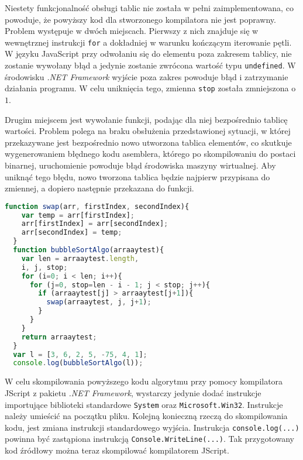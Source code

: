 \par Niestety funkcjonalność obsługi tablic nie została w pełni zaimplementowana, co powoduje, że powyższy kod dla stworzonego kompilatora nie jest poprawny. Problem występuje w dwóch miejscach. Pierwszy z nich znajduje się w wewnętrznej instrukcji \texttt{for} a dokładniej w warunku kończącym iterowanie pętli. W języku JavaScript przy odwołaniu się do elementu poza zakresem tablicy, nie zostanie wywołany błąd a jedynie zostanie zwrócona wartość typu \texttt{undefined}. W środowisku \textit{.NET Framework} wyjście poza zakres powoduje błąd i zatrzymanie działania programu. W celu uniknięcia tego, zmienna \texttt{stop} została zmniejszona o $1$. 
\par Drugim miejscem jest wywołanie funkcji, podając dla niej bezpośrednio tablicę wartości. Problem polega na braku obsłużenia przedstawionej sytuacji, w której przekazywane jest bezpośrednio nowo utworzona tablica elementów, co skutkuje wygenerowaniem błędnego kodu asemblera, którego po skompilowaniu do postaci binarnej, uruchomienie powoduje błąd środowiska maszyny wirtualnej. Aby uniknąć tego błędu, nowo tworzona tablica będzie najpierw przypisana do zmiennej, a dopiero następnie przekazana do funkcji.

\begin{lstlisting}[language=JavaScript, caption={Zmodyfikowany kod programu sortowania bąbelkowego.}, label=alg:alg1]
  function swap(arr, firstIndex, secondIndex){
    var temp = arr[firstIndex];
    arr[firstIndex] = arr[secondIndex];
    arr[secondIndex] = temp;
  }
  function bubbleSortAlgo(arraaytest){
    var len = arraaytest.length,
    i, j, stop;
    for (i=0; i < len; i++){
      for (j=0, stop=len - i - 1; j < stop; j++){
        if (arraaytest[j] > arraaytest[j+1]){
          swap(arraaytest, j, j+1);
        }
      }
    }
    return arraaytest;
  }
  var l = [3, 6, 2, 5, -75, 4, 1];
  console.log(bubbleSortAlgo(l));
\end{lstlisting}

\par W celu skompilowania powyższego kodu algorytmu przy pomocy kompilatora JScript z pakietu \textit{.NET Framework}, wystarczy jedynie dodać instrukcje importujące biblioteki standardowe \texttt{System} oraz \texttt{Microsoft.Win32}. Instrukcje należy umieścić na początku pliku. Kolejną konieczną rzeczą do skompilowania kodu, jest zmiana instrukcji standardowego wyjścia. Instrukcja \texttt{console.log(...)} powinna być zastąpiona instrukcją \texttt{Console.WriteLine(...)}. Tak przygotowany kod źródłowy można teraz skompilować kompilatorem JScript.

